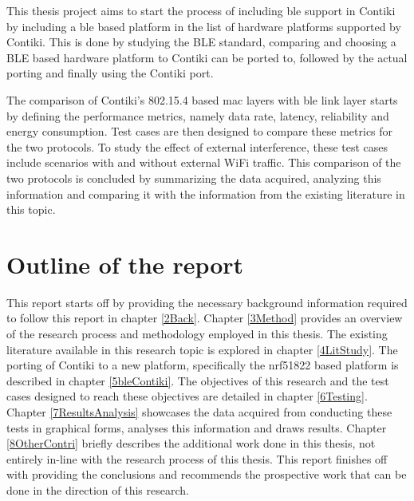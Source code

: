 This thesis project aims to start the process of including \gls{ble} support in Contiki by including a \gls{ble} based platform in the list of hardware platforms supported by Contiki. This is done by studying the BLE standard, comparing and choosing a BLE based hardware platform to Contiki can be ported to, followed by the actual porting and finally using the Contiki port. 

The comparison of Contiki's 802.15.4 based \gls{mac} layers with \gls{ble} link layer starts by defining the performance metrics, namely data rate, latency, reliability and energy consumption. Test cases are then designed to compare these metrics for the two protocols. To study the effect of external interference, these test cases include scenarios with and without external WiFi traffic. This comparison of the two protocols is concluded by summarizing the data acquired, analyzing this information and comparing it with the information from the existing literature in this topic.



\section{Outline of the report}

This report starts off by providing the necessary background information required to follow this report in chapter \ref{2Back}. Chapter \ref{3Method} provides an overview of the research process and methodology employed in this thesis. The existing literature available in this research topic is explored in chapter \ref{4LitStudy}. The porting of Contiki to a new platform, specifically the nrf51822 based platform is described in chapter \ref{5bleContiki}. The objectives of this research and the test cases designed to reach these objectives are detailed in chapter \ref{6Testing}. Chapter \ref{7ResultsAnalysis} showcases the data acquired from conducting these tests in graphical forms, analyses this information and draws results. Chapter \ref{8OtherContri} briefly describes the additional work done in this thesis, not entirely in-line with the research process of this thesis. This report finishes off with providing the conclusions and recommends the prospective work that can be done in the direction of this research.

\listoftodos
